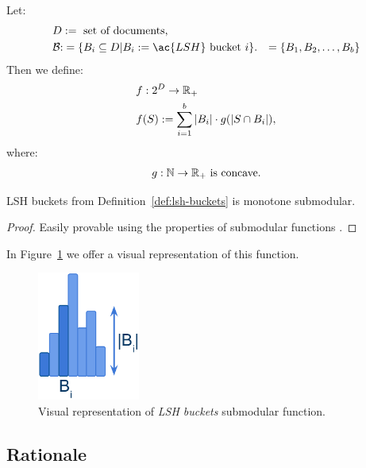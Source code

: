 \begin{definition}
  \label{def:lsh-buckets}
  Let:
  \begin{align*}
    &D := \text{ set of documents,} \\
    &\B
    \begin{aligned}[t]
      :&= \{B_i \subseteq D | B_i := \ac{LSH} \text{ bucket } i\}.
      &= \{B_1, B_2, \ldots, B_b\} \\
    \end{aligned}
  \end{align*}
  Then we define:
  \begin{align*}
    &f : 2^D \to \mathbb{R}_+ \\
    &f(S) := \sum_{i=1}^b |B_i| \cdot g(|S \cap B_i|),
  \end{align*}
  where:
    \[g : \mathbb{N} \to \mathbb{R}_+ \text{ is concave.}\]
\end{definition}

\begin{proposition}
  \label{prop:lsh-buckets}
  \ac{LSH} buckets from Definition~\ref{def:lsh-buckets} is monotone
  submodular.
  \begin{proof}
    Easily provable using the properties of submodular functions
    \cite{krause2012submodular}.
  \end{proof}
\end{proposition}

In Figure~\ref{fig:lsh-buckets} we offer a visual representation of this
function.
\begin{figure}
  \centering
  \includegraphics[width=0.3\textwidth,natwidth=426,natheight=535]{images/lsh-buckets.png}
  \caption{Visual representation of \emph{LSH buckets} submodular function.}
  \label{fig:lsh-buckets}
\end{figure}

\subsection{Rationale}

